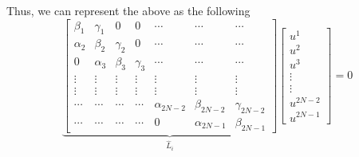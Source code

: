\documentclass[12pt]{article}
\theoremstyle{definition}
\theoremstyle{remark}
\begin{document}
Thus, we can represent the above as the following
\[
\underbrace{
\begin{bmatrix}
\beta_1    & \gamma_1   & 0          & 0          & \cdots     & \cdots     & \cdots     \\
\alpha_2   & \beta_2    & \gamma_2   & 0          & \cdots     & \cdots     & \cdots     \\
0          & \alpha_3   & \beta_3    & \gamma_3   & \cdots     & \cdots     & \cdots     \\
\vdots     & \vdots     & \vdots     & \vdots     & \vdots     & \vdots     & \vdots     \\
\vdots     & \vdots     & \vdots     & \vdots     & \vdots     & \vdots     & \vdots     \\
\cdots     & \cdots     & \cdots     & \cdots     & \alpha_{2N-2} & \beta_{2N-2} & \gamma_{2N-2} \\
\cdots     & \cdots     & \cdots     & \cdots     & 0          & \alpha_{2N-1} & \beta_{2N-1}
\end{bmatrix}
}_{\hat{L}_i}
\begin{bmatrix}
u^1 \\ u^2 \\ u^3 \\ \vdots \\ \vdots \\ u^{2N-2} \\ u^{2N-1}
\end{bmatrix}
= 0
\]


\end{document}
